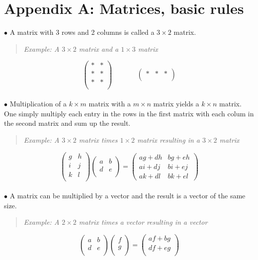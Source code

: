 \documentclass{article}
\begin{document}
\section*{Appendix A: Matrices, basic rules}
$\bullet$ A matrix with 3 rows and 2 columns is called a $3\times2$ matrix.
\begin{quote}
\textit{Example: A $3 \times 2$ matrix and a $1 \times 3$ matrix}
\end{quote}
$$\begin{pmatrix}
* & * \\
* & * \\
* & * \\
\end{pmatrix}~~~~~~~~~~~~~~~~
\begin{pmatrix}
* & * & *\\
\end{pmatrix}$$
\\
$\bullet$ Multiplication of a $k\times m$ matrix with a $m \times n$ matrix yields a $k \times n$ matrix.
\\One simply multiply each entry in the rows in the first matrix with each colum in the second matrix and sum up the result. 
\begin{quote}
\textit{Example: A $3 \times 2$ matrix times $1 \times 2$ matrix resulting in a $3 \times 2$ matrix}
\end{quote}$$
\begin{pmatrix}
g & h \\
i & j \\
k & l \\
\end{pmatrix}
\begin{pmatrix}
a & b \\
d & e \\
\end{pmatrix}=
\begin{pmatrix}
ag + dh & bg + eh \\
ai + dj & bi + ej \\
ak + dl & bk + el
\end{pmatrix}
$$
\\
$\bullet$ A matrix can be multiplied by a vector and the result is a vector of the same size.
\begin{quote}
\textit{Example: A $2 \times 2$ matrix times a vector resulting in a vector}
\end{quote}$$
\begin{pmatrix}
a & b \\
d & e \\
\end{pmatrix}
\begin{pmatrix}
f \\
g \\
\end{pmatrix} =
\begin{pmatrix}
af + bg \\
df + eg \\
\end{pmatrix}
$$
\\
\end{document}
